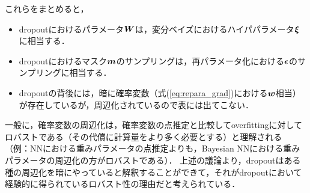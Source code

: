 これらをまとめると，
\begin{itemize}
\item dropoutにおけるパラメータ$\mbox{\boldmath $W$}$は，変分ベイズにおけるハイパパラメータ$\mbox{\boldmath $\xi$}$に相当する．
\item dropoutにおけるマスク$\mbox{\boldmath $m$}$のサンプリングは，再パラメータ化における$\mbox{\boldmath $\epsilon$}$のサンプリングに相当する．
\item dropoutの背後には，暗に確率変数（式(\ref{eq:repara_grad})における$\mbox{\boldmath $w$}$相当）が存在しているが，周辺化されているので表には出てこない．
\end{itemize}

一般に，確率変数の周辺化は，確率変数の点推定と比較してoverfittingに対してロバストである（その代償に計算量をより多く必要とする）と理解される
（例：NNにおける重みパラメータの点推定よりも，Bayesian NNにおける重みパラメータの周辺化の方がロバストである）．
上述の議論より，dropoutはある種の周辺化を暗にやっていると解釈することができて，それがdropoutにおいて経験的に得られているロバスト性の理由だと考えられている．
